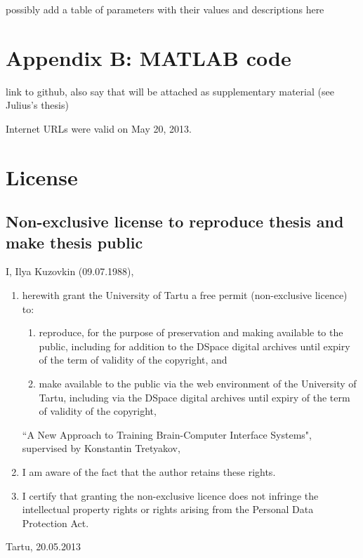 \documentclass[a4paper,12pt]{report}
\theoremstyle{definition}
\begin{document}
possibly add a table of parameters with their values and descriptions here

\chapter*{Appendix B: MATLAB code}

link to github, also say that will be attached as supplementary material (see Julius's thesis)





Internet URLs were valid on May 20, 2013.
\newpage



\chapter*{License}


%
%
\section*{Non-exclusive license to reproduce thesis and make thesis public}
I, Ilya Kuzovkin (09.07.1988), 
\begin{enumerate}
	\item herewith grant the University of Tartu a free permit (non-exclusive licence) to:
	\begin{enumerate}[label*=\arabic*.]
		\renewcommand{\theenumi}{\arabic{enumi}}
		\item reproduce, for the purpose of preservation and making available to the public, including for addition to the DSpace digital archives until expiry of the term of validity of the copyright, and
		\item make available to the public via the web environment of the University of Tartu, including via the DSpace digital archives until expiry of the term of validity of the copyright,
	\end{enumerate}
	``A New Approach to Training Brain-Computer Interface Systems", supervised by Konstantin Tretyakov,
	
	\item I am aware of the fact that the author retains these rights.

	\item I certify that granting the non-exclusive licence does not infringe the intellectual property rights or rights arising from the Personal Data Protection Act. 
\end{enumerate}

Tartu, 20.05.2013

\thispagestyle{empty}
\newpage
\end{document}
